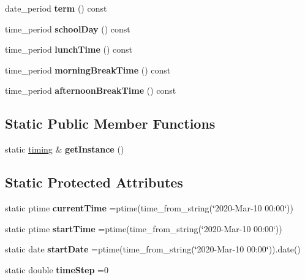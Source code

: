 \begin{DoxyCompactItemize}
\mbox{\label{classtiming_a79eb6645a9ccc90e59fc73594dc3b0c5}} 
date\+\_\+period {\bfseries term} () const
\item 
\mbox{\label{classtiming_a251ccabb3906aaa811758eea285b32ac}} 
time\+\_\+period {\bfseries school\+Day} () const
\item 
\mbox{\label{classtiming_af80c4617bd5afd2f7c23a08f163bd465}} 
time\+\_\+period {\bfseries lunch\+Time} () const
\item 
\mbox{\label{classtiming_af39bf7bf9b0c1a4429ed3d228660fd8f}} 
time\+\_\+period {\bfseries morning\+Break\+Time} () const
\item 
\mbox{\label{classtiming_a296ee7a0fce0144583b4ce632e669b89}} 
time\+\_\+period {\bfseries afternoon\+Break\+Time} () const
\end{DoxyCompactItemize}
\subsection*{Static Public Member Functions}
\begin{DoxyCompactItemize}
\item 
\mbox{\label{classtiming_a9495f6f63b2c27f1af4ac4dc736fff10}} 
static \mbox{\hyperlink{classtiming}{timing}} \& {\bfseries get\+Instance} ()
\end{DoxyCompactItemize}
\subsection*{Static Protected Attributes}
\begin{DoxyCompactItemize}
\item 
\mbox{\label{classtiming_a599549bbe9902602897b50118793a2f7}} 
static ptime {\bfseries current\+Time} =ptime(time\+\_\+from\+\_\+string(\char`\"{}2020-\/Mar-\/10 00\+:00\char`\"{}))
\item 
\mbox{\label{classtiming_a0b97e2508018c7aced9978138c1a44ab}} 
static ptime {\bfseries start\+Time} =ptime(time\+\_\+from\+\_\+string(\char`\"{}2020-\/Mar-\/10 00\+:00\char`\"{}))
\item 
\mbox{\label{classtiming_aa31635ef349e78a1689461213d316ed4}} 
static date {\bfseries start\+Date} =ptime(time\+\_\+from\+\_\+string(\char`\"{}2020-\/Mar-\/10 00\+:00\char`\"{})).date()
\item 
\mbox{\label{classtiming_abbabc1091ef472ea1210d319889f1793}} 
static double {\bfseries time\+Step} =0
\end{DoxyCompactItemize}
